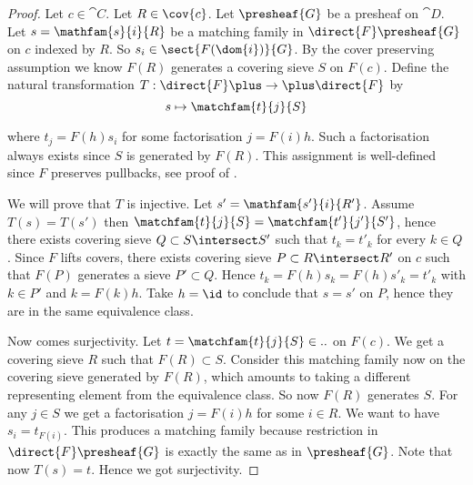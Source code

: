 
\begin{proof}
Let $c \in \cat{C}$.
Let $R \in \cov{c}$.
Let $\presheaf{G}$ be a presheaf on $\cat{D}$.
Let $s = \mathfam{s}{i}{R}$ be a matching family in $\direct{F}\presheaf{G}$ 
on $c$ indexed by $R$. So $s_i \in \sect{F(\dom{i})}{G}$.
By the cover preserving assumption we know $F(R)$ generates a covering sieve $S$ on $F(c)$.
Define the natural transformation $T: \direct{F}\plus \rightarrow \plus \direct{F}$ by 
\[ s \mapsto \matchfam{t}{j}{S} \]

where $t_j = F(h)s_i$ for some factorisation $j=F(i)h$. 
Such a factorisation always exists since $S$ is generated by $F(R)$.
This assignment is well-defined since $F$ preserves pullbacks, see proof of \cite[Lemma 2.3.3]{elephant}.

We will prove that $T$ is injective.
Let $s' = \mathfam{s'}{i}{R'}$.
Assume $T(s)=T(s')$
then $\matchfam{t}{j}{S} = \matchfam{t'}{j'}{S'}$,
hence there exists covering sieve $Q \subset S\intersect S'$
such that $t_k = t'_k$ for every $k\in Q$.
Since $F$ lifts covers, there exists covering sieve $P\subset R\intersect R'$ on $c$
such that $F(P)$ generates a sieve $P'\subset Q$.
Hence $t_k = F(h)s_k = F(h)s'_k = t'_k$ with $k\in P'$ and $k=F(k)h$.
Take $h=\id$ to conclude that $s=s'$ on $P$, hence they are in the same equivalence class.

Now comes surjectivity.
Let $t = \matchfam{t}{j}{S}\in..$ on $F(c)$.
We get a covering sieve $R$ such that $F(R)\subset S$.
Consider this matching family now on the covering sieve generated by $F(R)$, which amounts to taking a different representing element from the equivalence class. So now $F(R)$ generates $S$.
For any $j\in S$ we get a factorisation $j=F(i)h$ for some $i\in R$.
We want to have $s_i = t_{F(i)}$. 
This produces a matching family because restriction in $\direct{F}\presheaf{G}$ is exactly the same as in $\presheaf{G}$.
Note that now $T(s) = t$. Hence we got surjectivity.
\end{proof}


